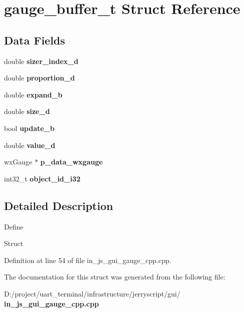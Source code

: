 \section{gauge\+\_\+buffer\+\_\+t Struct Reference}
\label{structgauge__buffer__t}
\subsection*{Data Fields}
\begin{DoxyCompactItemize}
\item 
\mbox{\label{structgauge__buffer__t_aae99f717aadbf88f890c71a293468af8}} 
double {\bfseries sizer\+\_\+index\+\_\+d}
\item 
\mbox{\label{structgauge__buffer__t_a93e3ac3895fbb25863fb66af78e0ed39}} 
double {\bfseries proportion\+\_\+d}
\item 
\mbox{\label{structgauge__buffer__t_a40506be5f1249944fed816e11465f5ca}} 
double {\bfseries expand\+\_\+b}
\item 
\mbox{\label{structgauge__buffer__t_a9e85cb0e3e93fb296755e54fa5f9fc10}} 
double {\bfseries size\+\_\+d}
\item 
\mbox{\label{structgauge__buffer__t_a4aed9ad79f44786d35de6f7804904494}} 
bool {\bfseries update\+\_\+b}
\item 
\mbox{\label{structgauge__buffer__t_a5a05b112887b06e0421e4950b7e0e2fe}} 
double {\bfseries value\+\_\+d}
\item 
\mbox{\label{structgauge__buffer__t_aa5c718c15f0a55ce345087b299daccc7}} 
wx\+Gauge $\ast$ {\bfseries p\+\_\+data\+\_\+wxgauge}
\item 
\mbox{\label{structgauge__buffer__t_aa7683407966206b7eb17d410ee75d880}} 
int32\+\_\+t {\bfseries object\+\_\+id\+\_\+i32}
\end{DoxyCompactItemize}


\subsection{Detailed Description}
Define

Struct 

Definition at line 54 of file in\+\_\+js\+\_\+gui\+\_\+gauge\+\_\+cpp.\+cpp.



The documentation for this struct was generated from the following file\+:\begin{DoxyCompactItemize}
\item 
D\+:/project/uart\+\_\+terminal/infrastructure/jerryscript/gui/\textbf{ in\+\_\+js\+\_\+gui\+\_\+gauge\+\_\+cpp.\+cpp}\end{DoxyCompactItemize}
